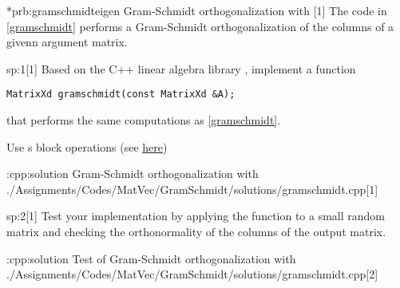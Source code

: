 \begin{samproblem}*{prb:gramschmidteigen}
        {Gram-Schmidt orthogonalization with \eigen{}}[1]{
The code in \cref{gramschmidt} performs a Gram-Schmidt
orthogonalization of the columns of a givenn argument matrix.
}

\begin{subproblem}{sp:1}[1]
  Based on the C++ linear algebra library \eigen{}, implement a function
  \begin{lstlisting}[style=cpp]
MatrixXd gramschmidt(const MatrixXd &A);
  \end{lstlisting}
  that performs the same computations as \cref{gramschmidt}.

  \begin{samhint}
    Use \eigen{}s block operations
    (see \href{https://eigen.tuxfamily.org/dox/group__TutorialBlockOperations.html}
    {here})
  \end{samhint}

  \begin{samsolution}
    \begin{samcode}[C++-code]{\cpl:cpp:solution}
        {Gram-Schmidt orthogonalization with \eigen{}}
        \samincludecpp
        {./Assignments/Codes/MatVec/GramSchmidt/solutions/gramschmidt.cpp}[1]
    \end{samcode}
  \end{samsolution}

\end{subproblem}

\begin{subproblem}{sp:2}[1]
  \label{sp:strassen:2}
  Test your implementation by applying the function 
  to a small random matrix
  and checking the orthonormality of the columns of the output
  matrix.

  \begin{samsolution}
    \begin{samcode}[C++-code]{\cpl:cpp:solution}
    {Test of Gram-Schmidt orthogonalization with \eigen{}}
      \samincludecpp
      {./Assignments/Codes/MatVec/GramSchmidt/solutions/gramschmidt.cpp}[2]
    \end{samcode}
  \end{samsolution}

\end{subproblem}

\end{samproblem}
